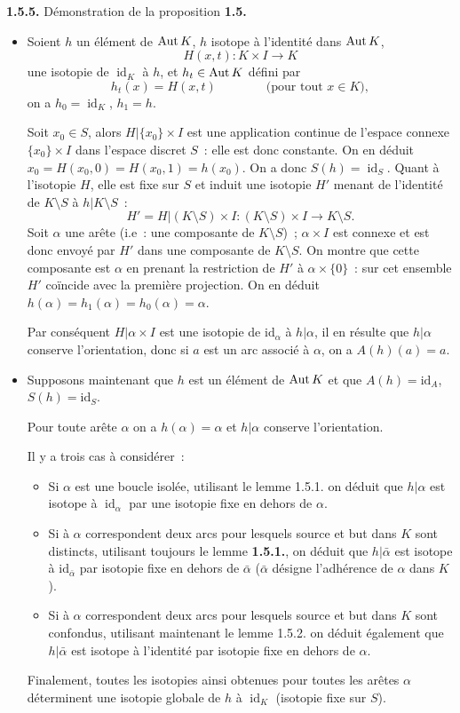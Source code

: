 {\bf 1.5.5.} Démonstration de la proposition {\bf 1.5.}
\begin{itemize}
\item[$1^{\circ}$)] Soient $h$ un élément de $\operatorname{Aut} K$, $h$ isotope à l'identité dans $\operatorname{Aut} K$,
\[
H(x,t) : K \times I \to K
\]
une isotopie de $\operatorname{id}_K$ à $h$, et $h_t \in \operatorname{Aut} K$ défini par
\[
h_t(x) = H(x,t) \qquad\qquad \text{(pour tout } x \in K\text{)},
\]
on a $h_0 = \operatorname{id}_K$, $h_1 = h$.

Soit $x_0 \in S$, alors $H|{\{x_0\} \times I}$ est une application continue de l'espace connexe $\{x_0\} \times I$ dans l'espace discret $S$~: elle est donc constante. On en déduit $x_0 = H(x_0,0) = H(x_0,1) = h(x_0)$. On a donc $S(h) = \operatorname{id}_S$. Quant à l'isotopie $H$, elle est fixe sur $S$ et induit une isotopie $H'$ menant de l'identité de $K \setminus S$ à $h | K \setminus S$~:
\[
H' = H | (K \setminus S) \times I : (K \setminus S) \times I \to K \setminus S.
\]
Soit $\alpha$ une arête (i.e~: une composante de $K \setminus S$)~; $\alpha \times I$ est connexe et est donc envoyé par $H'$ dans une composante de $K \setminus S$. On montre que cette composante est $\alpha$ en prenant la restriction de $H'$ à $\alpha \times \{0\}$~: sur cet ensemble $H'$ coïncide avec la première projection. On en déduit $h(\alpha) = h_1(\alpha) = h_0(\alpha) = \alpha$.

Par conséquent $H | \alpha \times I$ est une isotopie de $\text{id}_{\alpha}$ à $h | \alpha$, il en résulte que $h | \alpha$ conserve l'orientation, donc si $a$ est un arc associé à $\alpha$, on a $A(h)(a) = a$.
\item[$2^{\circ}$)] Supposons maintenant que $h$ est un élément de $\operatorname{Aut} K$ et que $A(h) = \text{id}_A$, $S(h) = \text{id}_S$.

Pour toute arête $\alpha$ on a $h(\alpha) = \alpha$ et $h | \alpha$ conserve l'orientation.

Il y a trois cas à considérer~:
\begin{itemize}
    \item[a)] Si $\alpha$ est une boucle isolée, utilisant le lemme 1.5.1. on déduit que $h | \alpha$ est isotope à $\operatorname{id}_{\alpha}$ par une isotopie fixe en dehors de $\alpha$.
    \item[b)] Si à $\alpha$ correspondent deux arcs pour lesquels source et but dans $K$ sont distincts, utilisant toujours le lemme {\bf 1.5.1.}, on déduit que $h | \bar{\alpha}$ est isotope à $\text{id}_{\bar{\alpha}}$ par isotopie fixe en dehors de $\bar{\alpha}$ ($\bar{\alpha}$ désigne l'adhérence de $\alpha$ dans $K$).
    \item[c)] Si à $\alpha$ correspondent deux arcs pour lesquels source et but dans $K$ sont confondus, utilisant maintenant le lemme 1.5.2. on déduit également que $h | \bar{\alpha}$ est isotope à l'identité par isotopie fixe en dehors de $\alpha$.
\end{itemize}
Finalement, toutes les isotopies ainsi obtenues pour toutes les arêtes $\alpha$ déterminent une isotopie globale de $h$ à $\operatorname{id}_K$ (isotopie fixe sur $S$).
\end{itemize}


